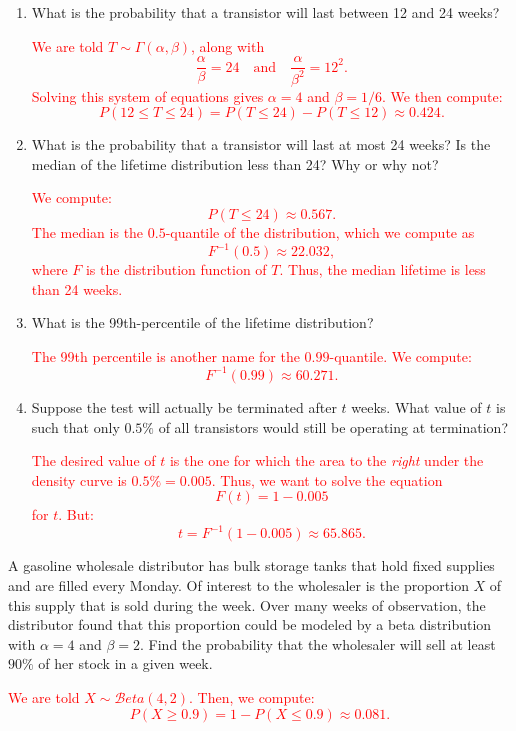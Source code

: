 \documentclass[12pt,reqno]{amsart}
\begin{document}
\medskip
\begin{enumerate}
\item What is the probability that a transistor will last between 12 and 24 weeks?

\bigskip
\textcolor{red}{We are told $T\sim \Gamma(\alpha,\beta)$, along with
	\[\frac{\alpha}{\beta} = 24 \quad \text{and} \quad \frac{\alpha}{\beta^2} = 12^2.
	\]
Solving this system of equations gives $\alpha = 4$ and $\beta = 1/6$. We then compute:
	\[P(12 \leq T \leq 24) = P(T\leq 24) - P(T\leq 12) \approx 0.424.
	\]}
\bigskip

\item What is the probability that a transistor will last at most 24 weeks? Is the median of the lifetime distribution less than 24? Why or why not?

\bigskip
\textcolor{red}{We compute:
	\[P(T \leq 24) \approx 0.567.
	\]
The median is the $0.5$-quantile of the distribution, which we compute as
	\[F^{-1}(0.5) \approx 22.032,
	\]
where $F$ is the distribution function of $T$. Thus, the median lifetime is less than 24 weeks.}
\bigskip

\item What is the 99th-percentile of the lifetime distribution?

\bigskip
\textcolor{red}{The 99th percentile is another name for the $0.99$-quantile. We compute:
	\[F^{-1}(0.99) \approx 60.271.
	\]}
\bigskip

\item Suppose the test will actually be terminated after $t$ weeks. What value of $t$ is such that only $0.5\%$ of all transistors would still be operating at termination?

\bigskip
\textcolor{red}{The desired value of $t$ is the one for which the area to the \textit{right} under the density curve is $0.5\% = 0.005$. Thus, we want to solve the equation
	\[F(t) = 1 - 0.005
	\]
for $t$. But:
	\[t = F^{-1}(1-0.005) \approx 65.865.
	\]}
\end{enumerate}










\bigskip
\prob A gasoline wholesale distributor has bulk storage tanks that hold fixed supplies and are filled every Monday. Of interest to the wholesaler is the proportion $X$ of this supply that is sold during the week. Over many weeks of observation, the distributor found that this proportion could be modeled by a beta distribution with $\alpha = 4$ and $\beta = 2$. Find the probability that the wholesaler will sell at least $90\%$ of her stock in a given week.


\bigskip
\textcolor{red}{We are told $X\sim \mathcal{B}eta(4,2)$. Then, we compute:
	\[P(X\geq 0.9) = 1- P(X\leq 0.9) \approx 0.081.
	\]}
\end{document}
